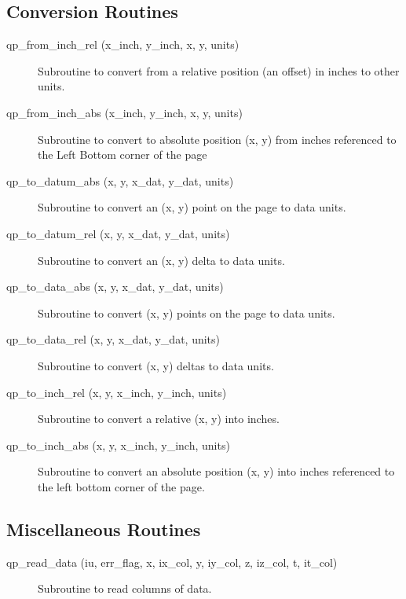 \subsection{Conversion Routines}

\begin{description}

\item[qp\_from\_inch\_rel (x\_inch, y\_inch, x, y, units)] \Newline 
     Subroutine to convert from a relative position (an offset) in inches
     to other units.

\item[qp\_from\_inch\_abs (x\_inch, y\_inch, x, y, units)] \Newline 
     Subroutine to convert to absolute position (x, y) from inches referenced
     to the Left Bottom corner of the page

\item[qp\_to\_datum\_abs (x, y, x\_dat, y\_dat, units)] \Newline 
     Subroutine to convert an (x, y) point on the page to data units.

\item[qp\_to\_datum\_rel (x, y, x\_dat, y\_dat, units)] \Newline 
     Subroutine to convert an (x, y) delta to data units.

\item[qp\_to\_data\_abs (x, y, x\_dat, y\_dat, units)] \Newline 
     Subroutine to convert (x, y) points on the page to data units.

\item[qp\_to\_data\_rel (x, y, x\_dat, y\_dat, units)] \Newline 
     Subroutine to convert (x, y) deltas to data units.

\item[qp\_to\_inch\_rel (x, y, x\_inch, y\_inch, units)] \Newline 
     Subroutine to convert a relative (x, y) into inches.

\item[qp\_to\_inch\_abs (x, y, x\_inch, y\_inch, units)] \Newline 
     Subroutine to convert an absolute position (x, y) into inches referenced
     to the left bottom corner of the page.

\end{description}

\subsection{Miscellaneous Routines}

\begin{description}

\item[qp\_read\_data (iu, err\_flag, x, ix\_col, y, iy\_col, z, iz\_col, 
                                                               t, it\_col) ] \Newline 
     Subroutine to read columns of data.

\end{description}

